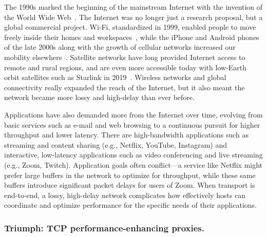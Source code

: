 The 1990s marked the beginning of the mainstream Internet with
the invention of the World Wide Web~\cite{www2025}. The
Internet was no longer just a research proposal, but a global commercial
project. Wi-Fi,
standardized in 1999, enabled people to move freely inside their homes and
workspaces~\cite{wifi2023}, while the iPhone and Android phones of the late
2000s along with the growth of cellular networks increased our mobility
elsewhere~\cite{smartphones2024}. Satellite
networks have long provided Internet access to remote and rural regions, and
are even more accessible today with low-Earth orbit satellites such as Starlink
in 2019~\cite{starlink2025}. Wireless networks and global connectivity really
expanded the reach of the Internet, but it also meant the network became more
lossy and high-delay than ever before.

Applications have also demanded more from the Internet over time, evolving from
basic services such as e-mail and web browsing to a continuous pursuit for
higher throughput and lower latency. There are high-bandwidth applications such
as streaming and content sharing (e.g., Netflix, YouTube, Instagram) and
interactive, low-latency applications such as video conferencing and live
streaming (e.g., Zoom, Twitch). Application goals often conflict---a service
like Netflix might prefer large buffers in the network to optimize for
throughput, while these same buffers introduce significant packet delays for
users of Zoom. When transport is end-to-end, a lossy, high-delay network
complicates how effectively hosts can coordinate and optimize performance for
the specific needs of their applications.

\subsubsection{Triumph: TCP performance-enhancing proxies.}




